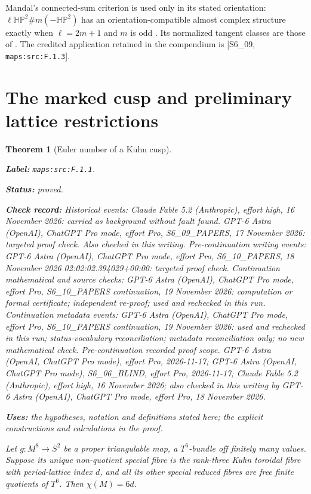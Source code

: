 \documentclass[11pt,a4paper]{article}
\newtheorem{theorem}{Theorem}[section]
\theoremstyle{definition}
\newcommand{\StatementRecord}[4]{\par\smallskip\begingroup\upshape\raggedright\noindent\textbf{Label:} \nolinkurl{#1}.\par\noindent\textbf{Status:} #2.\par\noindent\textbf{Check record:} #3.\par\noindent\textbf{Uses:} #4.\par\endgroup\smallskip}
\begin{document}
Mandal's connected-sum criterion is used only in its stated
orientation: $\ell\mathbb{HP}^2\#m(-\mathbb{HP}^2)$ has an
orientation-compatible almost complex structure exactly when
$\ell=2m+1$ and $m$ is odd
\cite[Corollary 1.4, p.~4, and its proof in \S5]{ffMandal}.
Its normalized tangent classes are those of
\cite[Lemma 2.1, p.~5, and Theorem 2.4, p.~7]{ffMandal}.
The credited application retained in the compendium is
[S6\_09, \nolinkurl{maps:src:F.1.3}].


\section{The marked cusp and preliminary lattice restrictions}



\begin{theorem}[Euler number of a Kuhn cusp]\label{maps:src:F.1.1}
\StatementRecord{maps:src:F.1.1}{proved}{Historical events: Claude Fable 5.2 (Anthropic), effort high, 16 November 2026: carried as background without fault found. GPT-6 Astra (OpenAI), ChatGPT Pro mode, effort Pro, S6\_09\_PAPERS, 17 November 2026: targeted proof check. Also checked in this writing. Pre-continuation writing events: GPT-6 Astra (OpenAI), ChatGPT Pro mode, effort Pro, S6\_10\_PAPERS, 18 November 2026 02:02:02.394029+00:00: targeted proof check. Continuation mathematical and source checks: GPT-6 Astra (OpenAI), ChatGPT Pro mode, effort Pro, S6\_10\_PAPERS continuation, 19 November 2026: computation or formal certificate; independent re-proof; used and rechecked in this run. Continuation metadata events: GPT-6 Astra (OpenAI), ChatGPT Pro mode, effort Pro, S6\_10\_PAPERS continuation, 19 November 2026: used and rechecked in this run; status-vocabulary reconciliation; metadata reconciliation only; no new mathematical check. \emph{Pre-continuation recorded proof scope.} GPT-6 Astra (OpenAI, ChatGPT Pro mode), effort Pro, 2026-11-17; GPT-6 Astra (OpenAI, ChatGPT Pro mode), S6\_06\_BLIND, effort Pro, 2026-11-17; Claude Fable 5.2 (Anthropic), effort high, 16 November 2026; also checked in this writing by GPT-6 Astra (OpenAI), ChatGPT Pro mode, effort Pro, 18 November 2026}{the hypotheses, notation and definitions stated here; the explicit constructions and calculations in the proof}


Let $g:M^8\to S^2$ be a proper triangulable map, a $T^6$-bundle
off finitely many values.  Suppose its unique non-quotient special
fibre is the rank-three Kuhn toroidal fibre with period-lattice
index $d$, and all its other special reduced fibres are free
finite quotients of $T^6$.  Then $\chi(M)=6d$.

\end{theorem}
\end{document}
